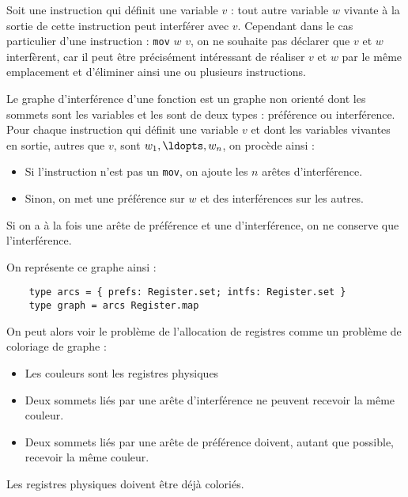 \documentclass{cours}
\begin{document}
Soit une instruction qui définit une variable $v$ : tout autre variable $w$ vivante à la sortie de cette instruction peut interférer avec $v$. Cependant dans le cas particulier d'une instruction : \texttt{mov} $w$ $v$, on ne souhaite pas déclarer que $v$ et $w$ interfèrent, car il peut être précisément intéressant de réaliser $v$ et $w$ par le même emplacement et d'éliminer ainsi une ou plusieurs instructions.
\begin{definition}
    Le graphe d'interférence d'une fonction est un graphe non orienté dont les sommets sont les variables et les sont de deux types : préférence ou interférence. \\
    Pour chaque instruction qui définit une variable $v$ et dont les variables vivantes en sortie, autres que $v$, sont $w_{1}, \ldopts, w_{n}$, on procède ainsi :
    \begin{itemize}
        \item Si l'instruction n'est pas un \texttt{mov}, on ajoute les $n$ arêtes d'interférence.
        \item Sinon, on met une préférence sur $w$ et des interférences sur les autres.
    \end{itemize}
    Si on a à la fois une arête de préférence et une d'interférence, on ne conserve que l'interférence.
\end{definition}

On représente ce graphe ainsi :
\begin{verbatim}
    type arcs = { prefs: Register.set; intfs: Register.set }
    type graph = arcs Register.map
\end{verbatim}

On peut alors voir le problème de l'allocation de registres comme un problème de coloriage de graphe :
\begin{itemize}
    \item Les couleurs sont les registres physiques
    \item Deux sommets liés par une arête d'interférence ne peuvent recevoir la même couleur.
    \item Deux sommets liés par une arête de préférence doivent, autant que possible, recevoir la même couleur.
\end{itemize}
Les registres physiques doivent être déjà coloriés.
\end{document}
